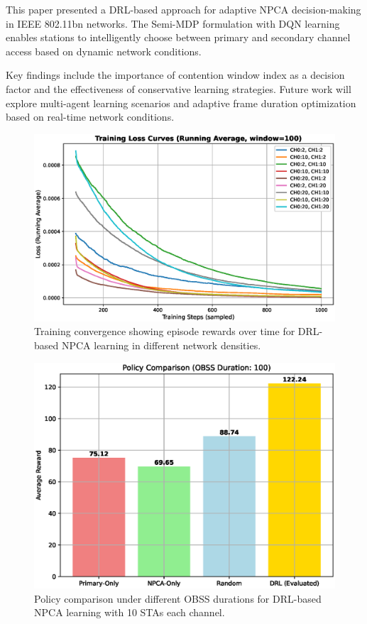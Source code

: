 \documentclass[conference]{IEEEtran}
\begin{document}
This paper presented a DRL-based approach for adaptive NPCA decision-making in IEEE 802.11bn networks. The Semi-MDP formulation with DQN learning enables stations to intelligently choose between primary and secondary channel access based on dynamic network conditions.

Key findings include the importance of contention window index as a decision factor and the effectiveness of conservative learning strategies. Future work will explore multi-agent learning scenarios and adaptive frame duration optimization based on real-time network conditions.


\begin{figure}
\centerline{\includegraphics[width=\columnwidth]{figure/loss_curves_ax7.eps}}
\caption{Training convergence showing episode rewards over time for DRL-based NPCA learning in different network densities.}
\label{fig:training_convergence}
\end{figure}

\begin{figure}
\centerline{\includegraphics[width=\columnwidth]{figure/policy_comparison_obss_100.eps}}
\caption{Policy comparison under different OBSS durations for DRL-based NPCA learning with 10 STAs each channel.}
\label{fig:policy_comparison}
\end{figure}
\end{document}
